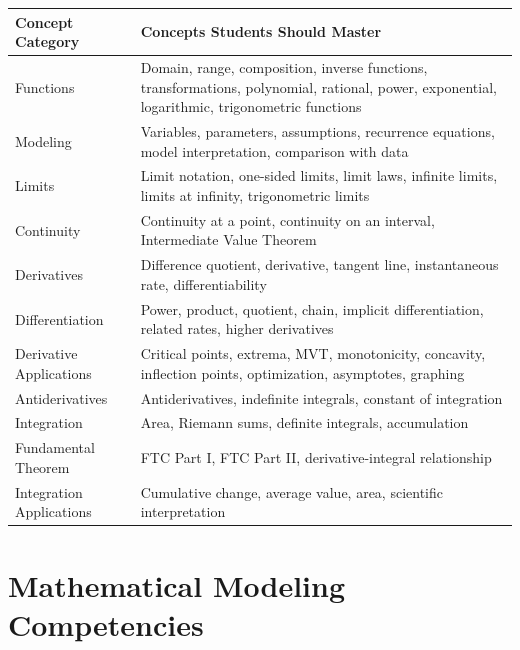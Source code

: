 \documentclass[11pt]{article}
\begin{document}
\begin{longtable}{p{4.0cm}p{8.8cm}}
\toprule
\textbf{Concept Category} & \textbf{Concepts Students Should Master} \\
\midrule

Functions
& Domain, range, composition, inverse functions, transformations,
polynomial, rational, power, exponential, logarithmic, trigonometric functions \\

Modeling
& Variables, parameters, assumptions, recurrence equations, model
interpretation, comparison with data \\

Limits
& Limit notation, one-sided limits, limit laws, infinite limits, limits at
infinity, trigonometric limits \\

Continuity
& Continuity at a point, continuity on an interval, Intermediate Value
Theorem \\

Derivatives
& Difference quotient, derivative, tangent line, instantaneous rate,
differentiability \\

Differentiation
& Power, product, quotient, chain, implicit differentiation, related rates,
higher derivatives \\

Derivative Applications
& Critical points, extrema, MVT, monotonicity, concavity, inflection points,
optimization, asymptotes, graphing \\

Antiderivatives
& Antiderivatives, indefinite integrals, constant of integration \\

Integration
& Area, Riemann sums, definite integrals, accumulation \\

Fundamental Theorem
& FTC Part I, FTC Part II, derivative-integral relationship \\

Integration Applications
& Cumulative change, average value, area, scientific interpretation \\

\bottomrule
\end{longtable}

\section{Mathematical Modeling Competencies}
\end{document}
